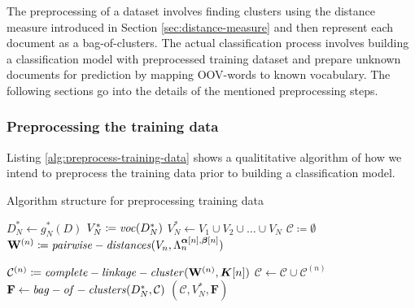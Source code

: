 The preprocessing of a dataset involves finding clusters using the distance
measure introduced in Section \ref{sec:distance-measure} and then represent each
document as a bag-of-clusters. The actual classification process involves
building a classification model with preprocessed training dataset and prepare
unknown documents for prediction by mapping OOV-words to known vocabulary. The
following sections go into the details of the mentioned preprocessing steps.  

\subsubsection{Preprocessing the training data}

Listing \ref{alg:preprocess-training-data} shows a qualititative algorithm of
how we intend to preprocess the training data prior to building a
classification model. 

\begin{algorithm}

\label{alg:preprocess-training-data}
\caption{Algorithm structure for preprocessing training data}
\begin{algorithmic}[1]
\label{alg:preprocess-training-data:parameters}
\State $D_N^* \gets g_N^*(D)$ 
\label{alg:preprocess-training-data:n-grams}
\State $V_N^* \coloneqq \mathit{voc}(D_N^*)$
\State $V_N^* \gets V_1 \cup V_2 \cup \ldots \cup V_N$
\State $\mathcal{C} \coloneqq \emptyset$
\label{alg:preprocess-training-data:loop}
\State $\mathbf{W}^{(n)} \coloneqq \mathit{pairwise-distances}(V_n,
\Lambda_n^{\boldsymbol \alpha[n], \boldsymbol \beta[n]})$

\State $\mathcal{C}^{(n)} \coloneqq
\mathit{complete-linkage-cluster}(\mathbf{W}^{(n)}, \boldsymbol K[n])$
\State $\mathcal{C} \gets \mathcal{C} \cup \mathcal{C}^{(n)}$
\EndFor
\State $\mathbf{F} \gets \mathit{bag-of-clusters}(D_N^*, \mathcal{C})$
\label{alg:preprocess-training-data:boc} 
\State \Return $(\mathcal{C}, V_N^*, \mathbf{F})$
\EndFunction
\end{algorithmic}
\end{algorithm}

